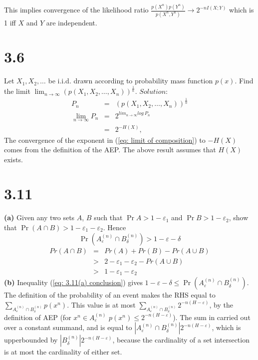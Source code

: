 \documentclass[10pt]{article}
\newcommand{\pref}[1]{{(\ref{#1})}}
\begin{document}
\begin{tiny}
\begin{multicols}{3}
This implies convergence of the likelihood ratio
$\frac{p(X^n)p(Y^n)}{p(X^n,Y^n)} \rightarrow 2^{-nI(X;Y)}$ which is 1 iff
$X$ and $Y$ are independent.
\section*{3.6}
Let $X_1,X_2,\dots$ be i.i.d. drawn according to probability mass function
$p(x)$. Find the limit $\lim_{n \to \infty}
(p(X_1,X_2,\dots,X_n))^{\frac{1}{n}}$.
$Solution$:
\begin{eqnarray}
    P_n &=& (p(X_1,X_2,\dots,X_n))^{\frac{1}{n}}
        \label{eq: defn P_n} \\
    \lim_{n\to \infty} P_n &=& 2^{lim_{n\to\infty}log\ P_n}
        \label{eq: limit of composition} \\
    &=& 2^{-H(X)},
        \label{eq: P_n limit} 
    \end{eqnarray} 
    The convergence of the exponent in \pref{eq: limit of composition} to
    $-H(X)$ comes from the definition of the AEP.
    The above result assumes that $H(X)$ exists.
\section*{3.11}
\textbf{(a)}
Given any two sets $A$, $B$ such that $\Pr{A} > 1-\varepsilon_1$ and
$\Pr{B} > 1-\varepsilon_2$, show that $\Pr(A\cap B) > 1 - \varepsilon_1 -
\varepsilon_2$. Hence
\begin{equation}
    \Pr(A_\varepsilon^{(n)} \cap B_\delta^{(n)}) > 1 - \varepsilon - \delta
    \label{eq: 3.11(a) conclusion}
\end{equation}
\proof
\begin{eqnarray}
    Pr(A\cap B) &=& Pr(A) + Pr(B) - Pr(A\cup B)
    \label{eq: pr A intersect B} \\
    &>& 2 - \varepsilon_1 - \varepsilon_2 - Pr(A\cup B)
    \label{eq: sub hypotheses} \\
    &>& 1 - \varepsilon_1 - \varepsilon_2
    \label{eq: 3.11a}
\end{eqnarray}
\textbf{(b)} 
Inequality \pref{eq: 3.11(a) conclusion} gives $1-\varepsilon-\delta \leq \Pr(A_\varepsilon^{(n)} \cap B_\delta^{(n)})$. 
The definition of the probability of an event makes the RHS equal to
$\sum_{A_\varepsilon^{(n)} \cap B_\delta^{(n)}} p(x^n)$.
This value is at most 
$\sum_{A_\varepsilon^{(n)} \cap B_\delta^{(n)}} 2^{-n(H-\varepsilon)}$, 
by the definition of AEP 
(for $x^n \in A_\varepsilon^{(n)}$ $p(x^n) \leq 2^{-n(H - \varepsilon)}$).
The sum in carried out over a constant summand, and is equal to
$|A_\varepsilon^{(n)} \cap B_\delta^{(n)}|2^{-n(H-\varepsilon)}$, which is
upperbounded by $|B_\delta^{(n)}|2^{-n(H-\varepsilon)}$, because the
cardinality of a set intersection is at most the cardinality of either
set.



\end{multicols}
\end{tiny}
\end{document}
